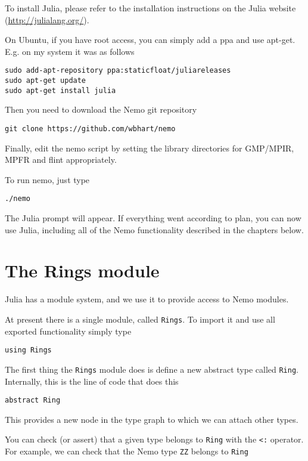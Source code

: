 \documentclass[a4paper,10pt]{article}
\newcommand{\code}{\lstinline}
\begin{document}
{{{{To install Julia, please refer to the installation instructions on the Julia website
(\url{http://julialang.org/}).

On Ubuntu, if you have root access, you can simply add a ppa and use apt-get. E.g. on
my system it was as follows

\begin{verbatim}
sudo add-apt-repository ppa:staticfloat/juliareleases
sudo apt-get update
sudo apt-get install julia
\end{verbatim}

Then you need to download the Nemo git repository

\begin{verbatim}
git clone https://github.com/wbhart/nemo
\end{verbatim}

Finally, edit the nemo script by setting the library directories for GMP/MPIR, MPFR
and flint appropriately.

To run nemo, just type

\begin{verbatim}
./nemo
\end{verbatim}

The Julia prompt will appear. If everything went according to plan, you can now use 
Julia, including all of the Nemo functionality described in the chapters below.

\section{The Rings module}

Julia has a module system, and we use it to provide access to Nemo modules.

At present there is a single module, called \code{Rings}. To import it and use all
exported functionality simply type

\begin{lstlisting}
using Rings
\end{lstlisting}

The first thing the \code{Rings} module does is define a new abstract type called
\code{Ring}. Internally, this is the line of code that does this

\begin{lstlisting}
abstract Ring
\end{lstlisting}

This provides a new node in the type graph to which we can attach other types. 

You can check (or assert) that a given type belongs to \code{Ring} with the
\code{<:} operator. For example, we can check that the Nemo type \code{ZZ} belongs
to \code{Ring}

}}}}
\end{document}
